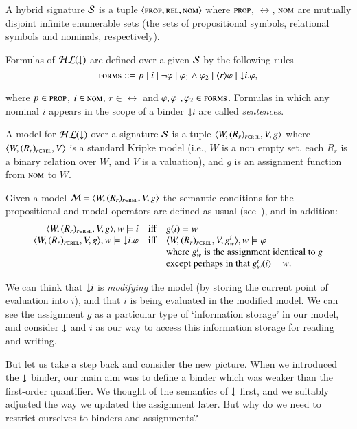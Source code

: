 \begin{defn} A hybrid signature $\mathcal{S}$ is a tuple $\langle \textsc{prop},\textsc{rel},\textsc{nom} \rangle$
where $\textsc{prop}$, $\rel$, $\textsc{nom}$ are mutually disjoint infinite
enumerable sets (the sets of propositional symbols, relational
symbols and nominals, respectively).

Formulas of $\mathcal{HL}({\downarrow})$ are defined over a given $\mathcal{S}$ by the
following rules
$$
\textsc{forms} ::= p \mid i \mid \lnot \varphi \mid \varphi_1 \land
\varphi_2 \mid \langle r \rangle \varphi \mid {\downarrow} i. \varphi,
$$

\noindent
where $p \in \textsc{prop}$, $i \in \textsc{nom}$,  $r \in \rel$  and $\varphi,
\varphi_1, \varphi_2 \in \textsc{forms}$. Formulas in which any nominal $i$
appears in the scope of a binder ${\downarrow} i$ are called
\emph{sentences}.

A model for $\mathcal{HL}({\downarrow})$ over a signature $\mathcal{S}$ is a tuple
$\langle W,(R_r)_{r \in \textsc{rel}},V,g \rangle$ where $\langle W,(R_r)_{r \in \textsc{rel}},V \rangle$ is a standard Kripke
model (i.e., $W$ is a non empty set, each $R_r$ is a binary relation
over $W$, and $V$ is a valuation), and $g$ is an assignment function
from $\textsc{nom}$ to $W$.

Given a model $\mathcal{M} = \langle W,(R_r)_{r \in \textsc{rel}},V,g \rangle$ the semantic conditions
for the propositional and modal operators are defined as usual
(see~\cite{BRV01}), and in addition:
$$
\begin{array}{rcl}
\langle W,(R_r)_{r \in \textsc{rel}},V,g \rangle, w \models  i & \mbox{iff} & g(i) = w\\
\langle W,(R_r)_{r \in \textsc{rel}},V,g \rangle, w \models {\downarrow} i.\varphi & \mbox{iff} &
  \langle W,(R_r)_{r \in \textsc{rel}},V,g^i_w \rangle, w \models \varphi\\
& & \mbox{where $g^i_w$ is the assignment identical to $g$}\\
& & \mbox{except perhaps in that $g^i_w(i)=w$}.
\end{array}
$$
\end{defn}

We can think that ${\downarrow} i$ is \emph{modifying} the model (by
storing the current point of evaluation into $i$), and that $i$ is
being evaluated in the modified model. We can see the assignment $g$
as a particular type of `information storage' in our model, and
consider ${\downarrow}$ and $i$ as our way to access this information
storage for reading and writing.

But let us take a step back and consider the new picture. When we
introduced the ${\downarrow}$ binder, our main aim was to define a binder
which was weaker than the first-order quantifier.  We thought of the
semantics of ${\downarrow}$ first, and we suitably adjusted the way we
updated the assignment later.   But why do we need to restrict
ourselves to binders and assignments?

